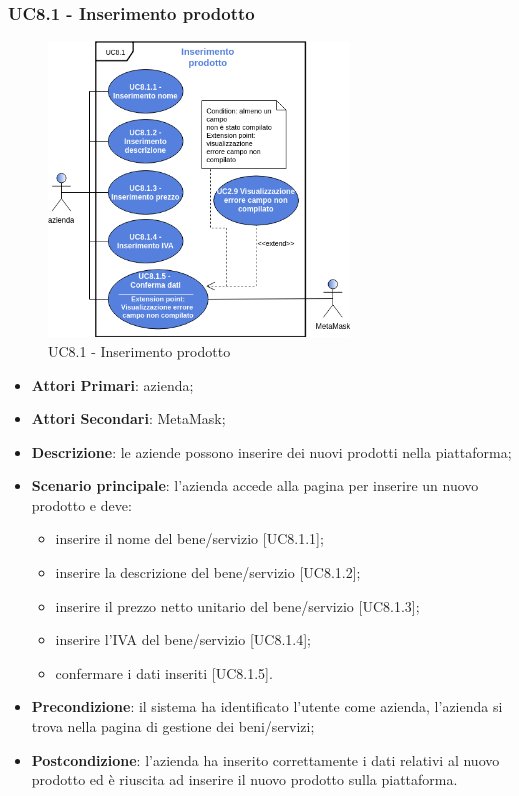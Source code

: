 \subsubsection{UC8.1 - Inserimento prodotto}
\begin{figure}[h]
	\includegraphics[width=8cm]{res/images/UC8-Inserimento.png}
	\centering
	\caption{UC8.1 - Inserimento prodotto}
\end{figure}
\begin{itemize}
	\item \textbf{Attori Primari}: azienda;
	\item \textbf{Attori Secondari}: MetaMask\glo;
	\item \textbf{Descrizione}: le aziende possono inserire dei nuovi prodotti nella piattaforma;
	\item \textbf{Scenario principale}: l'azienda accede alla pagina per inserire un nuovo prodotto e deve:
	\begin{itemize}
		\item inserire il nome del bene/servizio [UC8.1.1];
		\item inserire la descrizione del bene/servizio [UC8.1.2];
		\item inserire il prezzo netto unitario del bene/servizio [UC8.1.3];
		\item inserire l'IVA del bene/servizio [UC8.1.4];
		\item confermare i dati inseriti [UC8.1.5].
		
	\end{itemize}
	\item \textbf{Precondizione}: il sistema ha identificato l'utente come azienda, l'azienda si trova nella pagina di gestione dei beni/servizi;
	\item \textbf{Postcondizione}: l'azienda ha inserito correttamente i dati relativi al nuovo prodotto ed è riuscita ad inserire il nuovo prodotto sulla piattaforma.	
\end{itemize}
